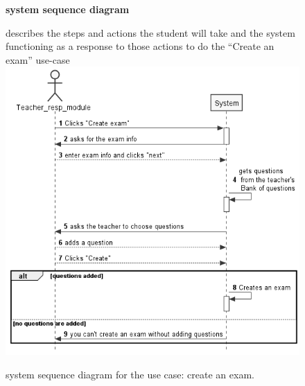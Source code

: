 \documentclass[]{uc2pfecaneva}
\begin{document}
    \begin{figure}
        \raggedright\textbf{system sequence diagram}\linebreak
        \raggedright{describes the steps and actions the student will take and the system functioning as a response
        to those actions to do the “Create an exam” use-case}\linebreak
        \includegraphics[width=\textwidth]{images/Create_Exam}
        \caption{system sequence diagram for the use case: create an exam.}
    \end{figure}
    \clearpage
\end{document}
